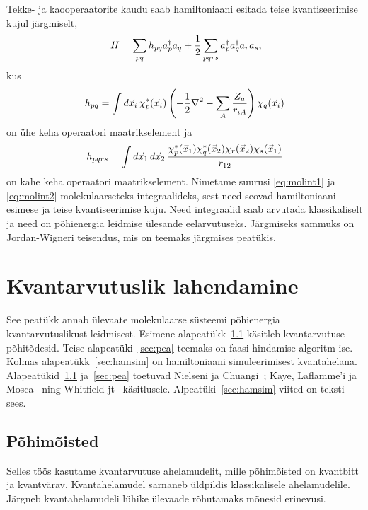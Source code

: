 \documentclass[12pt]{report}
\def\paren#1{\left(#1\right)}
\def\d#1{\mathinner{d#1}}
\begin{document}
Tekke- ja kaooperaatorite kaudu saab hamiltoniaani esitada teise kvantiseerimise kujul järgmiselt,
\begin{align}
    H = \sum_{pq}h_{pq}a_p^\dagger a_q
    + \frac{1}{2} \sum_{pqrs} a_p^\dagger a_q^\dagger a_r a_s \rlap{,}
\end{align}
kus
\begin{align}\label{eq:molint1}
    h_{pq} = \int\d{\vec{x}_i} \chi_p^*(\vec{x}_i)
    \paren{-\frac{1}{2} \nabla^2 - \sum_A \frac{Z_a}{r_{iA}}} \chi_q(\vec{x}_i)
\end{align}
on ühe keha operaatori maatrikselement ja
\begin{align}\label{eq:molint2}
    h_{pqrs} = \int \d{\vec{x}_1} \d{\vec{x}_2}
    \frac{\chi_p^*(\vec{x}_1) \chi_q^*(\vec{x}_2) \chi_r(\vec{x}_2) \chi_s(\vec{x}_1)}{r_{12}}
\end{align}
on kahe keha operaatori maatrikselement.
Nimetame suurusi \eqref{eq:molint1} ja \eqref{eq:molint2} molekulaarseteks integraalideks, sest need seovad hamiltoniaani esimese ja teise kvantiseerimise kuju.
Need integraalid saab arvutada klassikaliselt ja need on põhienergia leidmise ülesande eelarvutuseks.
Järgmiseks sammuks on Jordan-Wigneri teisendus, mis on teemaks järgmises peatükis.

\chapter{Kvantarvutuslik lahendamine}\label{chap:qcomp}

See peatükk annab ülevaate molekulaarse süsteemi põhienergia kvantarvutuslikust leidmisest.
Esimene alapeatükk~\ref{sec:terms} käsitleb kvantarvutuse põhitõdesid.
Teise alapeatüki~\ref{sec:pea} teemaks on faasi hindamise algoritm ise.
Kolmas alapeatükk~\ref{sec:hamsim} on hamiltoniaani simuleerimisest kvantahelana.
Alapeatükid~\ref{sec:terms} ja~\ref{sec:pea} toetuvad Nielseni ja Chuangi~\cite{nielsen+chuang}; Kaye, Laflamme'i ja Mosca~\cite{kaye+laflamme+mosca} ning Whitfield jt~\cite{whitfield+etal2011} käsitlusele.
Alpeatüki~\ref{sec:hamsim} viited on teksti sees.

\section{Põhimõisted}\label{sec:terms}

Selles töös kasutame kvantarvutuse ahelamudelit, mille põhimõisted on kvantbitt ja kvantvärav.
Kvantahelamudel sarnaneb üldpildis klassikalisele ahelamudelile.
Järgneb kvantahelamudeli lühike ülevaade rõhutamaks mõnesid erinevusi.
\end{document}
